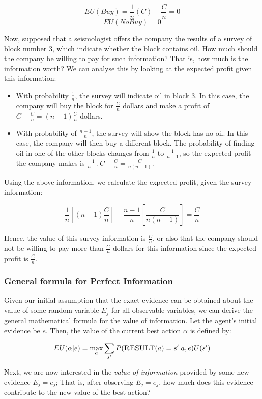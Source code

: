 \documentclass[11pt]{article}
\begin{document}
$$
EU(Buy) = \frac{1}{n}(C) - \frac{C}{n} = 0
$$
$$
EU(NoBuy) = 0
$$

Now, supposed that a seismologist offers the company the results of a survey of block number 3, which indicate whether the block contains oil. How much should the company be willing to pay for such information? That is, how much is the information worth? We can analyse this by looking at the expected profit given this information:

\begin{itemize}
    \item With probability $\frac{1}{n}$, the survey will indicate oil in block 3. In this case, the company will buy the block for $\frac{C}{n}$ dollars and make a profit of $C - \frac{C}{n} = (n-1)\frac{C}{n}$ dollars.
    \item With probability of $\frac{n-1}{n}$, the survey will show the block has no oil. In this case, the company will then buy a different block. The probability of finding oil in one of the other blocks changes from $\frac{1}{n}$ to $\frac{1}{n-1}$, so the expected profit the company makes is $\frac{1}{n-1}C - \frac{C}{n} = \frac{C}{n(n-1)}$.
\end{itemize}

Using the above information, we calculate the expected profit, given the survey information:

$$
\frac{1}{n}[(n-1)\frac{C}{n}] + \frac{n-1}{n}[\frac{C}{n(n-1)}] = \frac{C}{n}
$$

Hence, the value of this survey information is $\frac{C}{n}$, or also that the company should not be willing to pay more than $\frac{C}{n}$ dollars for this information since the expected profit is $\frac{C}{n}$.

\subsubsection{General formula for Perfect Information}

Given our initial assumption that the exact evidence can be obtained about the value of some random variable $E_j$ for all observable variables, we can derive the general mathematical formula for the value of information. Let the agent's initial evidence be $e$. Then, the value of the current best action $\alpha$ is defined by:

$$
EU(\alpha | e) = \underset{a}{\max} \sum_{s'} P(\textsc{RESULT}(a)=s'|a, e) U(s')
$$

Next, we are now interested in the \textit{value of information} provided by some new evidence $E_j = e_j$; That is, after observing $E_j = e_j$, how much does this evidence contribute to the new value of the best action?
\end{document}
